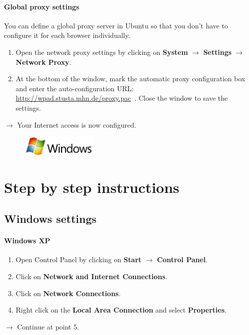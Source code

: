 \documentclass[a4paper,12pt]{scrartcl}
\newcommand{\optemph}[1]{\textbf{#1}}
\begin{document}
\paragraph*{Global proxy settings}
You can define a global proxy server in Ubuntu so that you don't have to configure it for each browser individually.
\begin{enumerate}
	\item Open the network proxy settings by clicking on \optemph{System} $\rightarrow$ \optemph{Settings} $\rightarrow$ \optemph{Network Proxy}.
    \item At the bottom of the window, mark the automatic proxy configuration box and enter the auto-configuration URL: \url{http://wpad.stusta.mhn.de/proxy.pac}\ . Close the window to save the settings.
\end{enumerate}
$\rightarrow$ Your Internet access is now configured.



\newpage
\enlargethispage{20pt}

\begin{figure}[t!]
    \raggedleft
    \vspace{-20pt}
    \includegraphics[height=1cm,keepaspectratio]{Bilder/Windows_logo}
    \vspace{-20pt}
\end{figure}

\section*{Step by step instructions}
\subsection*{Windows settings}
\paragraph*{Windows XP}
\begin{enumerate}
	\item Open Control Panel by clicking on \optemph{Start} $\rightarrow$ \optemph{Control Panel}.
    \item Click on \optemph{Network and Internet Connections}.
	\item Click on \optemph{Network Connections}.
	\item Right click on the \optemph{Local Area Connection} and select \optemph{Properties}.
\end{enumerate}
$\rightarrow$ Continue at point 5.
\end{document}
